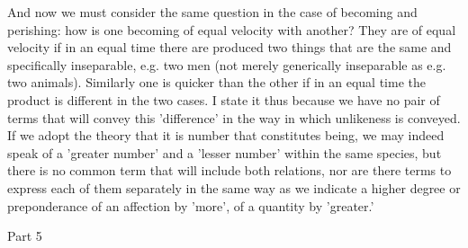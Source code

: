 And now we must consider the same question in the case of becoming
and perishing: how is one becoming of equal velocity with another?
They are of equal velocity if in an equal time there are produced
two things that are the same and specifically inseparable, e.g. two
men (not merely generically inseparable as e.g. two animals). Similarly
one is quicker than the other if in an equal time the product is different
in the two cases. I state it thus because we have no pair of terms
that will convey this 'difference' in the way in which unlikeness
is conveyed. If we adopt the theory that it is number that constitutes
being, we may indeed speak of a 'greater number' and a 'lesser number'
within the same species, but there is no common term that will include
both relations, nor are there terms to express each of them separately
in the same way as we indicate a higher degree or preponderance of
an affection by 'more', of a quantity by 'greater.' 

Part 5

